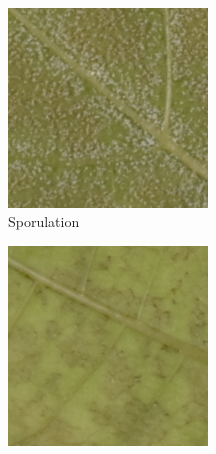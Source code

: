 \documentclass[english]{article}
\begin{document}
\paragraph{}
\begin{figure}[H]
    \centering
    \begin{subfigure}[b]{0.2\linewidth}
        \includegraphics[width=\linewidth]{p_viticola/resources/images/2023_a_oiv_sporulation.png}
        \caption{Sporulation}\label{fig:sporulation}
    \end{subfigure}
    \begin{subfigure}[b]{0.2\linewidth}
        \includegraphics[width=\linewidth]{p_viticola/resources/images/2023_a_oiv_stains.png}

\end{subfigure}
\end{figure}
\end{document}
